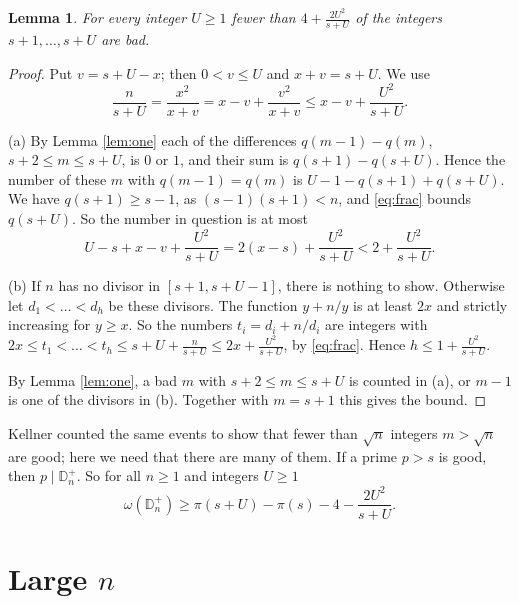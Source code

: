 \documentclass[11pt]{amsart}
\newtheorem{lemma}[theorem]{Lemma}
\theoremstyle{remark}
\numberwithin{equation}{section}
\newcommand{\Dp}{\mathbb D^{+}}
\begin{document}
\begin{lemma}\label{lem:bad}
For every integer $U\ge1$ fewer than $4+\frac{2U^2}{s+U}$ of the integers $s+1,\dots,s+U$ are bad.
\end{lemma}
\begin{proof}
Put $v=s+U-x$; then $0<v\le U$ and $x+v=s+U$. We use
\begin{equation}\label{eq:frac}
\frac n{s+U}=\frac{x^2}{x+v}=x-v+\frac{v^2}{x+v}\le x-v+\frac{U^2}{s+U}.
\end{equation}

(a) By Lemma \ref{lem:one} each of the differences $q(m-1)-q(m)$, $s+2\le m\le s+U$, is $0$ or $1$, and their sum is $q(s+1)-q(s+U)$.
Hence the number of these $m$ with $q(m-1)=q(m)$ is $U-1-q(s+1)+q(s+U)$. We have $q(s+1)\ge s-1$, as $(s-1)(s+1)<n$, and
\eqref{eq:frac} bounds $q(s+U)$. So the number in question is at most
\[
U-s+x-v+\frac{U^2}{s+U}=2(x-s)+\frac{U^2}{s+U}<2+\frac{U^2}{s+U}.
\]

(b) If $n$ has no divisor in $[s+1,s+U-1]$, there is nothing to show. Otherwise let $d_1<\dots<d_h$ be these divisors.
The function $y+n/y$ is at least $2x$ and strictly increasing for $y\ge x$. So the numbers $t_i=d_i+n/d_i$ are integers with
$2x\le t_1<\dots<t_h\le s+U+\frac n{s+U}\le2x+\frac{U^2}{s+U}$, by \eqref{eq:frac}. Hence $h\le1+\frac{U^2}{s+U}$.

By Lemma \ref{lem:one}, a bad $m$ with $s+2\le m\le s+U$ is counted in (a), or $m-1$ is one of the divisors in (b).
Together with $m=s+1$ this gives the bound.
\end{proof}

Kellner \cite[Lemma 7]{K17} counted the same events to show that fewer than $\sqrt n$ integers $m>\sqrt n$ are good;
here we need that there are many of them. If a prime $p>s$ is good, then $p\mid\Dp_n$. So for all $n\ge1$ and integers $U\ge1$
\begin{equation}\label{eq:main}
\omega(\Dp_n)\ge\pi(s+U)-\pi(s)-4-\frac{2U^2}{s+U}.
\end{equation}

\section{Large \texorpdfstring{$n$}{n}}
\end{document}
